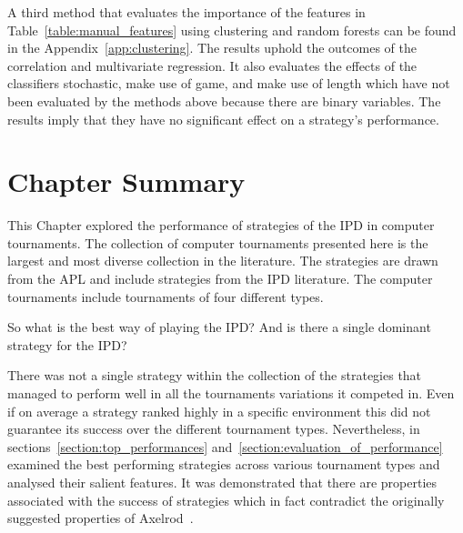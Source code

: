 A third method that evaluates the importance of the features in
Table~\ref{table:manual_features} using clustering and random forests can be found in
the Appendix~\ref{app:clustering}. The results uphold the outcomes of the
correlation and multivariate regression. It also evaluates the effects
of the classifiers stochastic, make use of game, and make use of length which
have not been evaluated by the methods above because there are binary variables.
The results imply that they have no significant effect on a strategy's
performance.

\section{Chapter Summary}\label{section:conclusion} %

This Chapter explored the performance of \numberofstrategies strategies of the
IPD in \numberofalltournaments computer tournaments. The collection of computer
tournaments presented here is the largest and most diverse collection in the
literature. The \numberofstrategies strategies are drawn from the APL and
include strategies from the IPD literature. The computer tournaments include
tournaments of four different types.

So what is the best way of playing the IPD? And is there a single dominant
strategy for the IPD? 

There was not a single strategy within the collection of the \numberofstrategies
strategies that managed to perform well in all the tournaments variations it
competed in. Even if on average a strategy ranked highly in a specific
environment this did not guarantee its success over the different tournament
types. Nevertheless, in sections~\ref{section:top_performances}
and~\ref{section:evaluation_of_performance} examined the best performing
strategies across various tournament types and analysed their salient features.
It was demonstrated that there are properties associated with the success of
strategies which in fact contradict the originally suggested properties of
Axelrod~\cite{Axelrod1981}.

